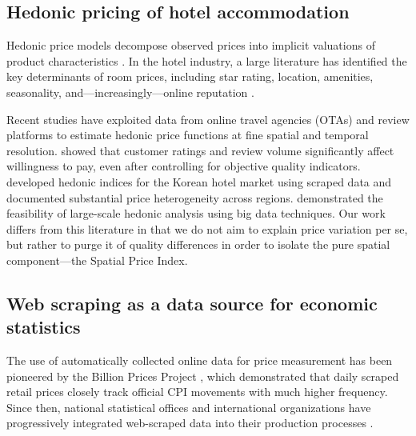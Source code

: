 \documentclass[12pt,a4paper]{article}
\begin{document}
\subsection{Hedonic pricing of hotel accommodation}

Hedonic price models decompose observed prices into implicit valuations of product characteristics \citep{rosen1974hedonic}. In the hotel industry, a large literature has identified the key determinants of room prices, including star rating, location, amenities, seasonality, and---increasingly---online reputation \citep{zhang2011determinants, espinet2003effect}.

Recent studies have exploited data from online travel agencies (OTAs) and review platforms to estimate hedonic price functions at fine spatial and temporal resolution. \citet{kim2021hedonic} showed that customer ratings and review volume significantly affect willingness to pay, even after controlling for objective quality indicators. \citet{choi2022hedonic} developed hedonic indices for the Korean hotel market using scraped data and documented substantial price heterogeneity across regions. \citet{li2023bigdata} demonstrated the feasibility of large-scale hedonic analysis using big data techniques. Our work differs from this literature in that we do not aim to explain price variation per se, but rather to purge it of quality differences in order to isolate the pure spatial component---the Spatial Price Index.

\subsection{Web scraping as a data source for economic statistics}

The use of automatically collected online data for price measurement has been pioneered by the Billion Prices Project \citep{cavallo2016billion}, which demonstrated that daily scraped retail prices closely track official CPI movements with much higher frequency. Since then, national statistical offices and international organizations have progressively integrated web-scraped data into their production processes \citep{eurostat2020webscraping, tenBosch2020webscraping}.
\end{document}
